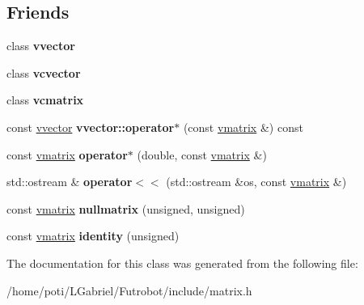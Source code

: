 \subsection*{Friends}
\begin{DoxyCompactItemize}
\item 
class {\bfseries vvector}\hypertarget{classvmatrix_a15049ecbebd7aeaf58b17c60666ef8f6}{}\label{classvmatrix_a15049ecbebd7aeaf58b17c60666ef8f6}

\item 
class {\bfseries vcvector}\hypertarget{classvmatrix_a57a5699049f52275a82ce9168124f639}{}\label{classvmatrix_a57a5699049f52275a82ce9168124f639}

\item 
class {\bfseries vcmatrix}\hypertarget{classvmatrix_a262d03e4aeb778d2fd1c2a00daa45cbc}{}\label{classvmatrix_a262d03e4aeb778d2fd1c2a00daa45cbc}

\item 
const \hyperlink{classvvector}{vvector} {\bfseries vvector\+::operator$\ast$} (const \hyperlink{classvmatrix}{vmatrix} \&) const \hypertarget{classvmatrix_aec0c863558d16371b41c88d9d169e857}{}\label{classvmatrix_aec0c863558d16371b41c88d9d169e857}

\item 
const \hyperlink{classvmatrix}{vmatrix} {\bfseries operator$\ast$} (double, const \hyperlink{classvmatrix}{vmatrix} \&)\hypertarget{classvmatrix_af7d9f5efc9c742646861fe09be2c74de}{}\label{classvmatrix_af7d9f5efc9c742646861fe09be2c74de}

\item 
std\+::ostream \& {\bfseries operator$<$$<$} (std\+::ostream \&os, const \hyperlink{classvmatrix}{vmatrix} \&)\hypertarget{classvmatrix_aa65fdd6d0e9e80d3480d4ac6d524f028}{}\label{classvmatrix_aa65fdd6d0e9e80d3480d4ac6d524f028}

\item 
const \hyperlink{classvmatrix}{vmatrix} {\bfseries nullmatrix} (unsigned, unsigned)\hypertarget{classvmatrix_a51d2a22f25b293c1ee778311fe44dcea}{}\label{classvmatrix_a51d2a22f25b293c1ee778311fe44dcea}

\item 
const \hyperlink{classvmatrix}{vmatrix} {\bfseries identity} (unsigned)\hypertarget{classvmatrix_aadef82d26f9c3a1093ec8ac9eea4c335}{}\label{classvmatrix_aadef82d26f9c3a1093ec8ac9eea4c335}

\end{DoxyCompactItemize}


The documentation for this class was generated from the following file\+:\begin{DoxyCompactItemize}
\item 
/home/poti/\+L\+Gabriel/\+Futrobot/include/matrix.\+h\end{DoxyCompactItemize}
